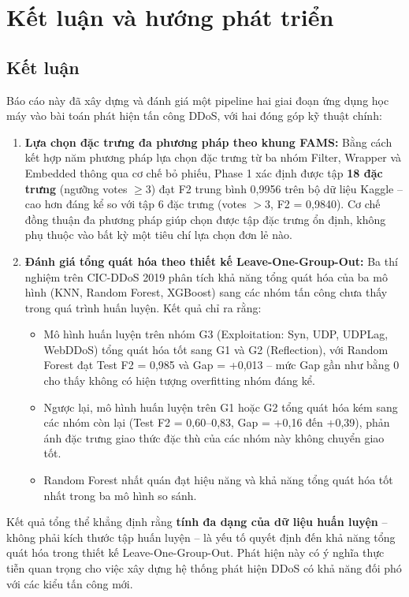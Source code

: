 \section{Kết luận và hướng phát triển}
\label{sec:ket-luan}

\subsection{Kết luận}

Báo cáo này đã xây dựng và đánh giá một pipeline hai giai đoạn ứng dụng học máy vào bài toán phát hiện tấn công DDoS, với hai đóng góp kỹ thuật chính:

\begin{enumerate}
    \item \textbf{Lựa chọn đặc trưng đa phương pháp theo khung FAMS:} Bằng cách kết hợp năm phương pháp lựa chọn đặc trưng từ ba nhóm Filter, Wrapper và Embedded thông qua cơ chế bỏ phiếu, Phase 1 xác định được tập \textbf{18 đặc trưng} (ngưỡng votes $\geq 3$) đạt F2 trung bình 0,9956 trên bộ dữ liệu Kaggle -- cao hơn đáng kể so với tập 6 đặc trưng (votes $> 3$, F2 = 0,9840). Cơ chế đồng thuận đa phương pháp giúp chọn được tập đặc trưng ổn định, không phụ thuộc vào bất kỳ một tiêu chí lựa chọn đơn lẻ nào.

    \item \textbf{Đánh giá tổng quát hóa theo thiết kế Leave-One-Group-Out:} Ba thí nghiệm trên CIC-DDoS 2019 phân tích khả năng tổng quát hóa của ba mô hình (KNN, Random Forest, XGBoost) sang các nhóm tấn công chưa thấy trong quá trình huấn luyện. Kết quả chỉ ra rằng:
    \begin{itemize}
        \item Mô hình huấn luyện trên nhóm G3 (Exploitation: Syn, UDP, UDPLag, WebDDoS) tổng quát hóa tốt sang G1 và G2 (Reflection), với Random Forest đạt Test F2 = 0,985 và Gap = +0,013 -- mức Gap gần như bằng 0 cho thấy không có hiện tượng overfitting nhóm đáng kể.
        \item Ngược lại, mô hình huấn luyện trên G1 hoặc G2 tổng quát hóa kém sang các nhóm còn lại (Test F2 = 0,60--0,83, Gap = +0,16 đến +0,39), phản ánh đặc trưng giao thức đặc thù của các nhóm này không chuyển giao tốt.
        \item Random Forest nhất quán đạt hiệu năng và khả năng tổng quát hóa tốt nhất trong ba mô hình so sánh.
    \end{itemize}
\end{enumerate}

Kết quả tổng thể khẳng định rằng \textbf{tính đa dạng của dữ liệu huấn luyện} -- không phải kích thước tập huấn luyện -- là yếu tố quyết định đến khả năng tổng quát hóa trong thiết kế Leave-One-Group-Out. Phát hiện này có ý nghĩa thực tiễn quan trọng cho việc xây dựng hệ thống phát hiện DDoS có khả năng đối phó với các kiểu tấn công mới.

